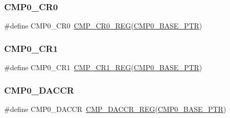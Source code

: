 \subsubsection{\texorpdfstring{C\+M\+P0\+\_\+\+C\+R0}{CMP0\_CR0}}
{\footnotesize\ttfamily \#define C\+M\+P0\+\_\+\+C\+R0~\hyperlink{group___c_m_p___register___accessor___macros_ga027ebf4e2c4654b6e863e070cb299128}{C\+M\+P\+\_\+\+C\+R0\+\_\+\+R\+EG}(\hyperlink{group___c_m_p___peripheral_ga5a7a6b1d0743a05435ba5cb2dc2b3431}{C\+M\+P0\+\_\+\+B\+A\+S\+E\+\_\+\+P\+TR})}

\mbox{\label{group___c_m_p___register___accessor___macros_ga993cebfc8cb6bcf6caec49cd75218d17}} 
\subsubsection{\texorpdfstring{C\+M\+P0\+\_\+\+C\+R1}{CMP0\_CR1}}
{\footnotesize\ttfamily \#define C\+M\+P0\+\_\+\+C\+R1~\hyperlink{group___c_m_p___register___accessor___macros_gaccbe9acfec0cbe3a83f7331f899f3240}{C\+M\+P\+\_\+\+C\+R1\+\_\+\+R\+EG}(\hyperlink{group___c_m_p___peripheral_ga5a7a6b1d0743a05435ba5cb2dc2b3431}{C\+M\+P0\+\_\+\+B\+A\+S\+E\+\_\+\+P\+TR})}

\mbox{\label{group___c_m_p___register___accessor___macros_ga35e0e1f16fe611949cc7970ad0119891}} 
\subsubsection{\texorpdfstring{C\+M\+P0\+\_\+\+D\+A\+C\+CR}{CMP0\_DACCR}}
{\footnotesize\ttfamily \#define C\+M\+P0\+\_\+\+D\+A\+C\+CR~\hyperlink{group___c_m_p___register___accessor___macros_ga5b7c17c68ee9198e701deff8f750ca2b}{C\+M\+P\+\_\+\+D\+A\+C\+C\+R\+\_\+\+R\+EG}(\hyperlink{group___c_m_p___peripheral_ga5a7a6b1d0743a05435ba5cb2dc2b3431}{C\+M\+P0\+\_\+\+B\+A\+S\+E\+\_\+\+P\+TR})}

